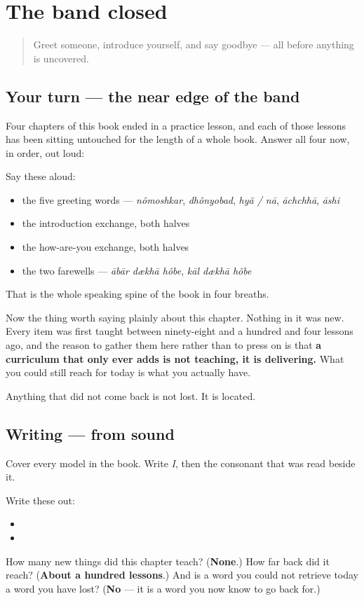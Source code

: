 \section[Practice]{The band closed}

\label{lesson:BN-R01-practice}



\begin{quote}
Greet someone, introduce yourself, and say goodbye — all before anything is uncovered.
\end{quote}

\subsection*{Your turn — the near edge of the band}
Four chapters of this book ended in a practice lesson, and each of those lessons has been sitting untouched for the length of a whole book. Answer all four now, in order, out loud:

Say these aloud:

\begin{itemize}
\raggedright
  \item the five greeting words — \emph{nômoshkar}, \emph{dhônyobad}, \emph{hyã / nā}, \emph{āchchhā}, \emph{āshi}
  \item the introduction exchange, both halves
  \item the how-are-you exchange, both halves
  \item the two farewells — \emph{ābār dækhā hôbe}, \emph{kāl dækhā hôbe}
\end{itemize}

That is the whole speaking spine of the book in four breaths.

Now the thing worth saying plainly about this chapter. Nothing in it was new. Every item was first taught between ninety-eight and a hundred and four lessons ago, and the reason to gather them here rather than to press on is that \textbf{a curriculum that only ever adds is not teaching, it is delivering.} What you could still reach for today is what you actually have.

Anything that did not come back is not lost. It is located.

\subsection*{Writing — from sound}
Cover every model in the book. Write \emph{I}, then the consonant that was read beside it.

Write these out:

\begin{itemize}
\raggedright
  \item {}
  \item {}
\end{itemize}

\begin{tcolorbox}[breakable,colback=teal!4,colframe=teal!35!black,title={Before you move on}]
How many new things did this chapter teach? (\textbf{None}.) How far back did it reach? (\textbf{About a hundred lessons}.) And is a word you could not retrieve today a word you have lost? (\textbf{No} — it is a word you now know to go back for.)
\end{tcolorbox}
